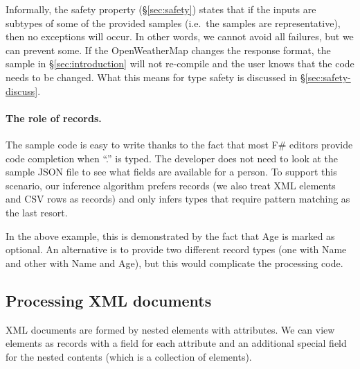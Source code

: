\documentclass[10pt,preprint,blind,clearpagebib]{sigplanconf}
\newcommand{\ident}[1]{\textnormal{\sffamily #1}}
\begin{document}
Informally, the safety property (\S\ref{sec:safety}) states that if the inputs
are subtypes of some of the provided samples (i.e.~the samples are representative), then
no exceptions will occur. In other words, we cannot avoid all failures, but we can prevent some.
If the OpenWeatherMap changes the response format, the sample in \S\ref{sec:introduction}
will not re-compile and the user knows that the code needs to be changed. What this means for
type safety is discussed in \S\ref{sec:safety-discuss}.

\paragraph{The role of records.}
The sample code is easy to write thanks to the fact that most F\# editors provide code completion
when ``.'' is typed. The developer does not need to look at the sample JSON file to see what fields
are available for a person. To support this scenario, our inference algorithm prefers records 
(we also treat XML elements and CSV rows as records) and only infers types that require pattern 
matching as the last resort.

In the above example, this is demonstrated by the fact that \ident{Age} is marked as optional.
An alternative is to provide two different record types (one with \ident{Name} and other with 
\ident{Name} and \ident{Age}), but this would complicate the processing code.


\subsection{Processing XML documents}
\label{sec:providers-xml}

XML documents are formed by nested elements with attributes. We can view elements as records with 
a field for each attribute and an additional special field for the nested contents (which is a 
collection of elements).
\end{document}
